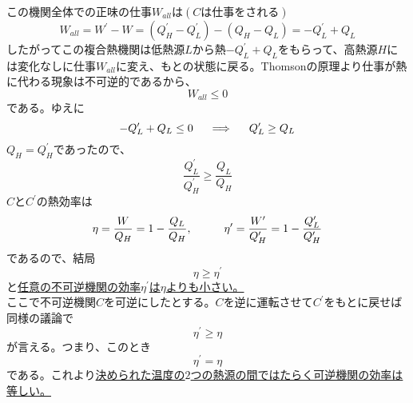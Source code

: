 \documentclass{jsarticle}
\begin{document}
この機関全体での正味の仕事\(W_{all}\)は\((Cは仕事をされる)\)
\[W_{all}=W^{\prime}-W=(Q_{H}^{\prime}-Q_{L}^{\prime})-(Q_{H}-Q_{L})=-Q_{L}^{\prime}+Q_{L}\]
したがってこの複合熱機関は低熱源\(L\)から熱\(-Q_{L}^{\prime}+Q_{L}\)をもらって、高熱源\(H\)には変化なしに仕事\(W_{all}\)に変え、もとの状態に戻る。Thomsonの原理より仕事が熱に代わる現象は不可逆的であるから、
\[W_{all}\leq0\]
である。ゆえに
\[-Q_{L}^{\prime}+Q_{L}\leq0\hspace{5mm}\Longrightarrow\hspace{5mm}Q_{L}^{\prime}\geq Q_{L}\]
\(Q_{H}=Q_{H}^{\prime}\)であったので、
\[\frac{Q_{L}^{\prime}}{Q_{H}^{\prime}}\geq\frac{Q_{L}}{Q_{H}}\]
\(C\)と\(C^{\prime}\)の熱効率は
\[\eta=\frac{W}{Q_{H}}=1-\frac{Q_{L}}{Q_{H}},\hspace{10mm}\eta^{\prime}=\frac{W^{\prime}}{Q_{H}^{\prime}}=1-\frac{Q_{L}^{\prime}}{Q_{H}^{\prime}}\]
であるので、結局
\[\eta\geq\eta^{\prime}\]
と\underline{任意の不可逆機関の効率\(\eta^{\prime}\)は\(\eta\)よりも小さい。}\\
ここで不可逆機関\(C\)を可逆にしたとする。\(C\)を逆に運転させて\(C^{\prime}\)をもとに戻せば同様の議論で
\[\eta^{\prime}\geq\eta\]
が言える。つまり、このとき
\[\eta^{\prime}=\eta\]
である。これより\underline{決められた温度の\(2\)つの熱源の間ではたらく可逆機関の効率は等しい。}\\
\end{document}
